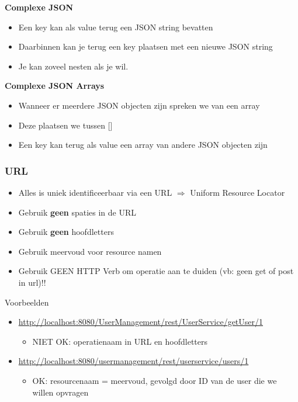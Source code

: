 \documentclass{article}
\newcommand{\bold}[1]{\textbf{#1}}
\begin{document}
\bold{Complexe JSON}

\begin{itemize}
    \item Een key kan als value terug een JSON string bevatten
    \item Daarbinnen kan je terug een key plaatsen met een nieuwe JSON string
    \item Je kan zoveel nesten als je wil.
\end{itemize}

\bold{Complexe JSON Arrays}

\begin{itemize}
    \item Wanneer er meerdere JSON objecten zijn spreken we van een array
    \item Deze plaatsen we tussen []
    \item Een key kan terug als value een array van andere JSON objecten zijn
\end{itemize}

\subsubsection{URL}
\begin{itemize}
    \item Alles is uniek identificeerbaar via een URL $\Rightarrow$ Uniform Resource Locator
    \item Gebruik \bold{geen} spaties in de URL
    \item Gebruik \bold{geen} hoofdletters
    \item Gebruik meervoud voor resource namen
    \item Gebruik GEEN HTTP Verb om operatie aan te duiden (vb: geen get of post in url)!!
\end{itemize}

Voorbeelden 

\begin{itemize}
    \item \url{http://localhost:8080/UserManagement/rest/UserService/getUser/1} 
    \begin{itemize}
        \item NIET OK: operatienaam in URL en hoofdletters
    \end{itemize}
    \item \url{http://localhost:8080/usermanagement/rest/userservice/users/1} 
    \begin{itemize}
        \item OK: resourcenaam = meervoud, gevolgd door ID van de user die we willen opvragen
    \end{itemize}
\end{itemize}
\end{document}
